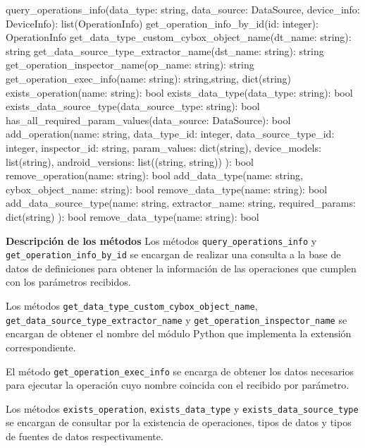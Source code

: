 \begin{python}[title=Interfaz DefinitionsDatabaseManager, captionpos=b]
query_operations_info(data_type: string, data_source: DataSource, 
                      device_info: DeviceInfo): list(OperationInfo)
get_operation_info_by_id(id: integer): OperationInfo
get_data_type_custom_cybox_object_name(dt_name: string): string
get_data_source_type_extractor_name(dst_name: string): string
get_operation_inspector_name(op_name: string): string 
get_operation_exec_info(name: string): string,string, dict(string)
exists_operation(name: string): bool
exists_data_type(data_type: string): bool
exists_data_source_type(data_source_type: string): bool
has_all_required_param_values(data_source: DataSource): bool
add_operation(name: string, data_type_id: integer,
              data_source_type_id: integer,
              inspector_id: string,
              param_values: dict(string), 
              device_models: list(string),
              android_versions: list((string, string))
              ): bool
remove_operation(name: string): bool
add_data_type(name: string, cybox_object_name: string): bool
remove_data_type(name: string): bool
add_data_source_type(name: string,
                     extractor_name: string,
                     required_params: dict(string)
                     ): bool
remove_data_type(name: string): bool
\end{python}

\textbf{Descripción de los métodos} \newline
Los métodos \texttt{query\_operations\_info} y \texttt{get\_operation\_info\_by\_id} se encargan de realizar una consulta a la base de datos de definiciones para obtener la información de las operaciones que cumplen con los parámetros recibidos.

Los métodos \texttt{get\-\_data\-\_type\-\_custom\-\_cybox\-\_object\-\_name}, \texttt{get\-\_data\-\_source\-\_type\-\_extractor\-\_name} y \texttt{get\-\_operation\-\_inspector\-\_name} se encargan de obtener el nombre del módulo Python que implementa la extensión correspondiente.

El método \texttt{get\-\_operation\-\_exec\-\_info} se encarga de obtener los datos necesarios para ejecutar la operación cuyo nombre coincida con el recibido por parámetro.

Los métodos \texttt{exists\_operation}, \texttt{exists\_data\_type} y \texttt{exists\-\_data\-\_source\-\_type} se encargan de consultar por la existencia de operaciones, tipos de datos y tipos de fuentes de datos respectivamente.

